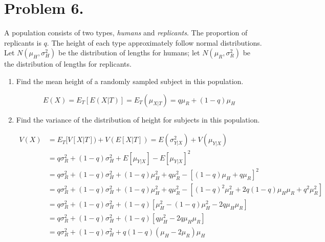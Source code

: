 \documentclass{article}
\newcommand{\1}{\mathbf{1}}
\begin{document}
\newpage



\newpage
\section*{Problem 6.}
A population consists of two types, {\it humans} and {\it replicants}. The proportion of replicants is $q$. The height of each type approximately follow normal distributions. Let $N(\mu_H,\sigma^2_H)$ be the distribution of lengths for humans; let $N(\mu_R,\sigma^2_R)$ be the distribution of lengths for replicants.
\begin{enumerate}
    \item Find the mean height of a randomly sampled subject in this population.
    
    $$E(X) = E_T[E(X|T)] = E_T(\mu_{X|T}) = q\mu_R + (1-q)\mu_H$$
    
    \item Find the variance of the distribution of height for subjects in this population.
    
    \begin{align*}
        V(X) &= E_T[V[X|T]) + V(E[X|T]) = E(\sigma_{Y|X}^2) + V(\mu_{Y|X}) \\
        &= q\sigma_R^2 + (1-q)\sigma_H^2 + E[\mu_{Y|X}] - E[\mu_{Y|X}]^2 \\
        &= q\sigma_R^2 + (1-q)\sigma_H^2 + (1-q)\mu_H^2 + q\mu_R^2 - \left[ (1-q)\mu_H + q\mu_R \right]^2\\
        &= q\sigma_R^2 + (1-q)\sigma_H^2 + (1-q)\mu_H^2 + q\mu_R^2 - \left[ (1-q)^2\mu_H^2 + 2q(1-q)\mu_H\mu_R + q^2\mu_R^2 \right]\\
        &= q\sigma_R^2 + (1-q)\sigma_H^2 + (1-q)\left[\mu_H^2 - (1-q)\mu_H^2 - 2q\mu_H\mu_R \right] \\
        &= q\sigma_R^2 + (1-q)\sigma_H^2 + (1-q)\left[q\mu_H^2 - 2q\mu_H\mu_R \right] \\
        &= q\sigma_R^2 + (1-q)\sigma_H^2 + q(1-q)(\mu_H - 2\mu_R)\mu_H
    \end{align*}
\end{enumerate}



\newpage
\end{document}
